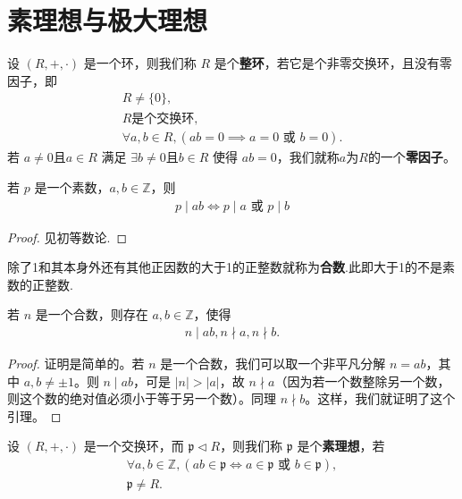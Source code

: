 \documentclass[../../main.tex]{subfiles}
\begin{document}
\section{素理想与极大理想}

\begin{definition}[整环]
设 $(R, +, \cdot)$ 是一个环，则我们称 $R$ 是个\textbf{整环}，若它是个非零交换环，且没有零因子，即
\begin{gather*}
R \neq \{0\},
\\
R \text{是个交换环},
\\
\forall a, b \in R, (ab = 0 \implies a = 0 \text{ 或 } b = 0).
\end{gather*}
若 $a \neq 0$且$a\in R$ 满足 $\exists b \neq 0$且$b\in R$ 使得 $ab = 0$，我们就称$a$为$R$的一个\textbf{零因子}。
\end{definition}

\begin{lemma}\label{lemma:素数的基本性质}
若 $p$ 是一个素数，$a, b \in \mathbb{Z}$，则
\begin{align*}
p \mid ab \iff p \mid a \text{ 或 } p \mid b
\end{align*}
\end{lemma}
\begin{proof}
见初等数论.
\end{proof}

\begin{definition}[合数]
除了1和其本身外还有其他正因数的大于1的正整数就称为\textbf{合数}.此即大于1的不是素数的正整数.
\end{definition}

\begin{lemma}\label{lemma:合数的基本性质}
若 $n$ 是一个合数，则存在 $a, b \in \mathbb{Z}$，使得
\begin{align*}
n \mid ab ,
n \nmid a ,
n \nmid b .
\end{align*}
\end{lemma}
\begin{proof}
证明是简单的。若 $n$ 是一个合数，我们可以取一个非平凡分解 $n = ab$，其中 $a, b \neq \pm 1$。则 $n \mid ab$，可是 $|n| > |a|$，故 $n \nmid a$（因为若一个数整除另一个数，则这个数的绝对值必须小于等于另一个数）。同理 $n \nmid b$。这样，我们就证明了这个引理。 
\end{proof}

\begin{definition}[素理想]
设 $(R, +, \cdot)$ 是一个交换环，而 $\mathfrak{p} \lhd R$，则我们称 $\mathfrak{p}$ 是个\textbf{素理想}，若
\begin{gather*}
\forall a, b \in \mathbb{Z}, (ab \in \mathfrak{p} \iff a \in \mathfrak{p} \text{ 或 } b \in \mathfrak{p}),
\\
\mathfrak{p} \neq R.
\end{gather*}
\end{definition}
\end{document}
